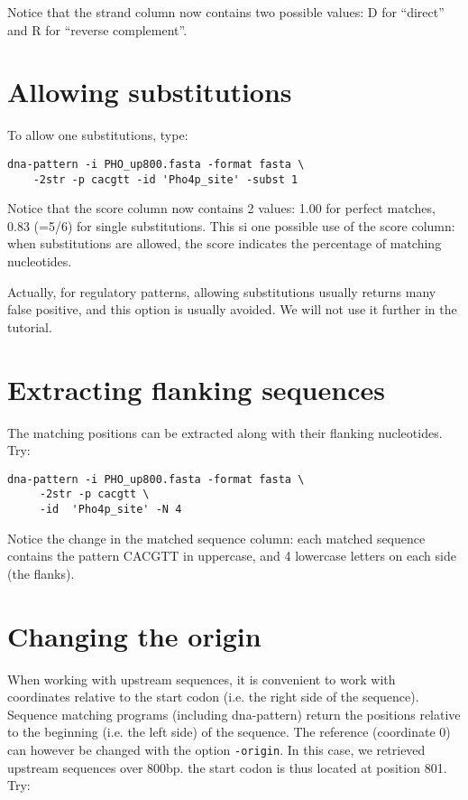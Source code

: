 Notice that the strand column now contains two possible values: D for
``direct'' and R for ``reverse complement''.

\section{Allowing substitutions}

To allow one substitutions, type:
{\color{Blue} \begin{footnotesize} 
\begin{verbatim}
dna-pattern -i PHO_up800.fasta -format fasta \
    -2str -p cacgtt -id 'Pho4p_site' -subst 1
\end{verbatim} \end{footnotesize}
}

Notice that the score column now contains 2 values: 1.00 for perfect
matches, 0.83 (=5/6) for single substitutions. This si one possible
use of the score column: when substitutions are allowed, the score
indicates the percentage of matching nucleotides.

Actually, for regulatory patterns, allowing substitutions usually
returns many false positive, and this option is usually avoided. We
will not use it further in the tutorial.

\section{Extracting flanking sequences}

The matching positions can be extracted along with their flanking nucleotides. Try:

{\color{Blue} \begin{footnotesize} 
\begin{verbatim}
dna-pattern -i PHO_up800.fasta -format fasta \
     -2str -p cacgtt \
     -id  'Pho4p_site' -N 4
\end{verbatim} \end{footnotesize}
}

Notice the change in the matched sequence column: each matched
sequence contains the pattern CACGTT in uppercase, and 4 lowercase
letters on each side (the flanks).

\section{Changing the origin}

When working with upstream sequences, it is convenient to work with
coordinates relative to the start codon (i.e. the right side of the
sequence). Sequence matching programs (including dna-pattern) return
the positions relative to the beginning (i.e. the left side) of the
sequence. The reference (coordinate 0) can however be changed with
the option \texttt{-origin}. In this case, we retrieved upstream
sequences over 800bp. the start codon is thus located at position
801. Try:

